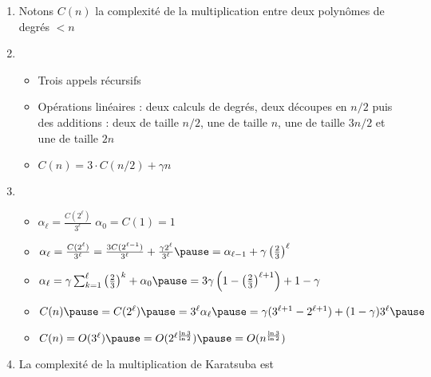 \begin{frame}
\begin{enumerate}
  \item Notons $C(n)$ la complexité de la multiplication entre deux polynômes de degrés $<n$

 \pause 
 
  \item
  \begin{itemize} 
    \item Trois appels récursifs
    \pause  
    \item Opérations linéaires : deux calculs de degrés, 
      deux découpes en $n/2$ puis des additions : 
      deux de taille $n/2$, une de taille $n$,
      une de taille $3n/2$ et une de taille $2n$ 
    \pause    
    \item $C(n) = 3 \cdot C(n/2) + \gamma n$   
  \end{itemize}
  
\pause   

  \item 
  \begin{itemize} 
    \item $\alpha_\ell= \frac{C(2^\ell)}{3^\ell}$ \pause \quad $\alpha_0 = C(1)=1$
\pause  
    \item $\alpha_\ell = \frac{C(2^\ell)}{3^\ell} = \frac{3 C(2^{\ell-1})}{3^\ell} + \frac{\gamma 2^\ell}{3^\ell} \pause =  \alpha_{\ell-1} + \gamma \left( \frac23  \right)^\ell$
\pause  
    \item $\alpha_\ell = \gamma \sum_{k=1}^\ell \left( \frac23  \right)^{k}+\alpha_0 
\pause  = 3\gamma\left( 1 -  \left( \frac23  \right)^{\ell+1} \right)+1-\gamma$
\pause  
    \item $C(n)\pause = C(2^\ell)\pause = 3^\ell \alpha_\ell \pause =\gamma(3^{\ell+1}-2^{\ell+1})+(1-\gamma)3^\ell\pause$
    
    \item $C(n) = O(3^\ell)\pause  = O(2^{\ell \frac{\ln 3}{\ln 2}})\pause  = O(n^\frac{\ln 3}{\ln 2})$

  \end{itemize}    
  
 \pause  
 
  \item La complexité de la multiplication de Karatsuba est 
   
\end{enumerate}

\end{frame}




